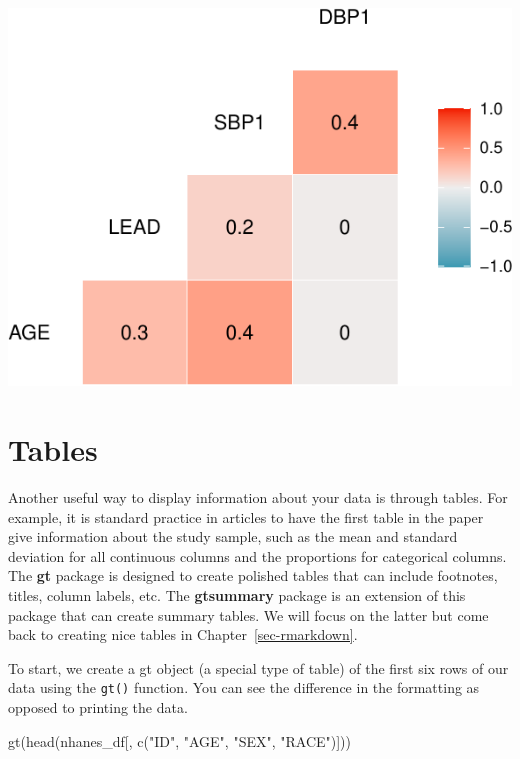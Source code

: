 \documentclass[
  letterpaper,
]{krantz}
\makeatletter
\newenvironment{Shaded}{\begin{snugshade}}{\end{snugshade}}
\newcommand{\FunctionTok}[1]{\textcolor[rgb]{0.28,0.35,0.67}{#1}}
\newcommand{\NormalTok}[1]{\textcolor[rgb]{0.00,0.23,0.31}{#1}}
\newcommand{\StringTok}[1]{\textcolor[rgb]{0.13,0.47,0.30}{#1}}
\newenvironment{kframe}{%
\medskip{}
\setlength{\fboxsep}{.8em}
 \def\at@end@of@kframe{}%
 \ifinner\ifhmode%
  \def\at@end@of@kframe{\end{minipage}}%
  \begin{minipage}{\columnwidth}%
 \fi\fi%
 \def\FrameCommand##1{\hskip\@totalleftmargin \hskip-\fboxsep
 \colorbox{shadecolor}{##1}\hskip-\fboxsep
     \hskip-\linewidth \hskip-\@totalleftmargin \hskip\columnwidth}%
 \MakeFramed {\advance\hsize-\width
   \@totalleftmargin\z@ \linewidth\hsize
   \@setminipage}}%
 {\par\unskip\endMakeFramed%
 \at@end@of@kframe}
\renewenvironment{Shaded}{\begin{kframe}}{\end{kframe}}
\makeatother
\begin{document}
\begin{center}
\includegraphics[width=1\textwidth,height=\textheight]{book/exploratory_analysis_files/figure-pdf/unnamed-chunk-24-1.pdf}
\end{center}

\section{Tables}\label{tables}

Another useful way to display information about your data is through
tables. For example, it is standard practice in articles to have the
first table in the paper give information about the study sample, such
as the mean and standard deviation for all continuous columns and the
proportions for categorical columns. The \textbf{gt} package is designed
to create polished tables that can include footnotes, titles, column
labels, etc. The \textbf{gtsummary} package is an extension of this
package that can create summary tables. We will focus on the latter but
come back to creating nice tables in Chapter~\ref{sec-rmarkdown}.

To start, we create a gt object (a special type of table) of the first
six rows of our data using the \texttt{gt()} function. You can see the
difference in the formatting as opposed to printing the data.

\begin{Shaded}
\begin{Highlighting}[]
\FunctionTok{gt}\NormalTok{(}\FunctionTok{head}\NormalTok{(nhanes\_df[, }\FunctionTok{c}\NormalTok{(}\StringTok{"ID"}\NormalTok{, }\StringTok{"AGE"}\NormalTok{, }\StringTok{"SEX"}\NormalTok{, }\StringTok{"RACE"}\NormalTok{)])) }
\end{Highlighting}
\end{Shaded}
\end{document}
